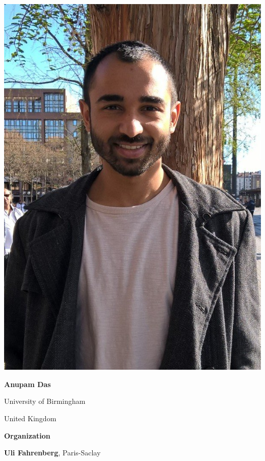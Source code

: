\documentclass[a3paper, 12pt]{article}
\begin{document}
\begin{minipage}[t]{.43\linewidth}
  \begin{minipage}{.2\linewidth}
    \includegraphics[width=\linewidth, trim=60 350 60 0, clip]{figs/anupam}
  \end{minipage}
  \hfill
  \begin{minipage}{.75\linewidth}
    \textbf{Anupam Das}

    University of Birmingham

    United Kingdom
  \end{minipage}

  \vspace*{2ex}
  
  \hfill {\Large \bf Organization}

  \smallskip

  \hfill \textbf{Uli Fahrenberg}, Paris-Saclay


\end{minipage}
\end{document}
